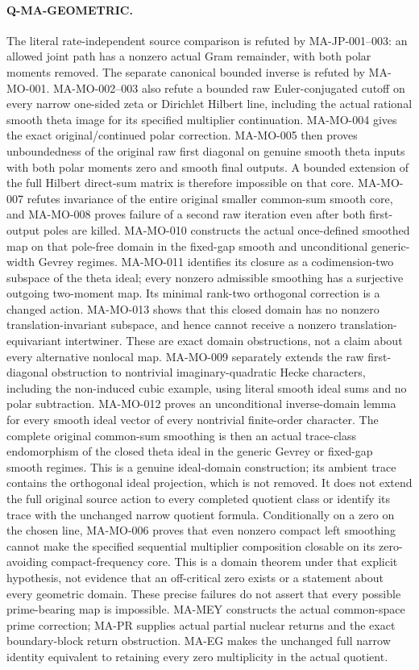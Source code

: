 \documentclass[11pt,a4paper]{article}
\begin{document}
\paragraph{Q-MA-GEOMETRIC.}
The literal rate-independent source comparison is refuted by
MA-JP-001--003: an allowed joint path has a nonzero actual Gram
remainder, with both polar moments removed. The separate canonical
bounded inverse is refuted by MA-MO-001. MA-MO-002--003 also
refute a bounded raw Euler-conjugated cutoff on every narrow
one-sided zeta or Dirichlet Hilbert line, including the actual
rational smooth theta image for its specified multiplier
continuation. MA-MO-004 gives the exact original/continued polar correction.
MA-MO-005 then proves unboundedness of the original raw first
diagonal on genuine smooth theta inputs with both polar moments
zero and smooth final outputs. A bounded extension of the full
Hilbert direct-sum matrix is therefore impossible on that core.
MA-MO-007 refutes invariance of the entire original smaller
common-sum smooth core, and MA-MO-008 proves failure of a
second raw iteration even after both first-output poles are
killed. MA-MO-010 constructs the actual once-defined smoothed
map on that pole-free domain in the fixed-gap smooth and
unconditional generic-width Gevrey regimes. MA-MO-011 identifies
its closure as a codimension-two subspace of the theta ideal;
every nonzero admissible smoothing has a surjective outgoing
two-moment map. Its minimal rank-two orthogonal correction is
a changed action. MA-MO-013 shows that this closed domain has
no nonzero translation-invariant subspace, and hence cannot
receive a nonzero translation-equivariant intertwiner.
These are exact domain obstructions, not a claim about every
alternative nonlocal map. MA-MO-009 separately extends the
raw first-diagonal obstruction to nontrivial imaginary-quadratic
Hecke characters, including the non-induced cubic example,
using literal smooth ideal sums and no polar subtraction.
MA-MO-012 proves an unconditional inverse-domain lemma for
every smooth ideal vector of every nontrivial finite-order
character. The complete original common-sum smoothing is then
an actual trace-class endomorphism of the closed theta ideal
in the generic Gevrey or fixed-gap smooth regimes. This is
a genuine ideal-domain construction; its ambient trace contains
the orthogonal ideal projection, which is not removed. It
does not extend the full original source action to every
completed quotient class or identify its trace with the
unchanged narrow quotient formula.
Conditionally on a zero on the chosen line, MA-MO-006 proves
that even nonzero compact left smoothing cannot make the
specified sequential multiplier composition closable on its
zero-avoiding compact-frequency core. This is a domain theorem
under that explicit hypothesis, not evidence that an off-critical
zero exists or a statement about every geometric domain.
These precise failures do
not assert that every possible prime-bearing map is impossible.
MA-MEY constructs the actual common-space prime correction;
MA-PR supplies actual partial nuclear returns and the exact
boundary-block return obstruction. MA-EG makes the unchanged
full narrow identity equivalent to retaining every zero
multiplicity in the actual quotient.
\end{document}
